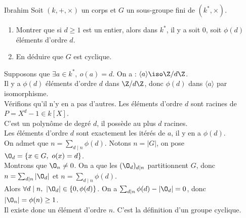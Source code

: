 \documentclass[11pt]{article}
\begin{document}
\begin{exercice}{Ibrahim}{}
    Soit $(k,+,\times)$ un corps et $G$ un sous-groupe fini de $(k^*,\times)$.
    \begin{enumerate}
        \item Montrer que si $d\geq1$ est un entier, alors dans $k^*$, il y a soit $0$, soit $\phi(d)$ éléments d'ordre $d$.
        \item En déduire que $G$ est cyclique.
    \end{enumerate}
    \tcblower
     Supposons que $\exists a \in k^*, ~ o(a)=d$. On a : $\langle a \rangle \iso \Z/d\Z$.\\
    Il y a $\phi(d)$ éléments d'ordre $d$ dans $\Z/d\Z$, donc $\phi(d)$ dans $\langle a \rangle$ par isomorphisme.\\
    Vérifions qu'il n'y en a pas d'autres. Les éléments d'ordre $d$ sont racines de $P=X^d-1\in k[X]$.\\
    C'est un polynôme de degré $d$, il possède au plus $d$ racines.\\
    Les éléments d'ordre $d$ sont exactement les itérés de $a$, il y en a $\phi(d)$.\\
     On admet que $n=\sum_{d\mid n}\phi(d)$. Notons $n=|G|$, on pose $\O_d=\{x\in G, ~ o(x)=d\}$.\\
    Montrons que $\O_n\neq0$. On a que les $(\O_d)_{d\mid n}$ partitionnent $G$, donc $n=\sum_{d\mid n}|\O_d|$ et $n=\sum_{d\mid n}\phi(d)$.\\
    Alors $\forall d \mid n, ~ |\O_d|\in\{0,\phi(d)\}$. On a $\sum_{d\mid n}\phi(d)-|\O_d|=0$, donc $|\O_n|=\phi(n)\geq1$.\\
    Il existe donc un élément d'ordre $n$. C'est la définition d'un groupe cyclique.
\end{exercice}
\end{document}
